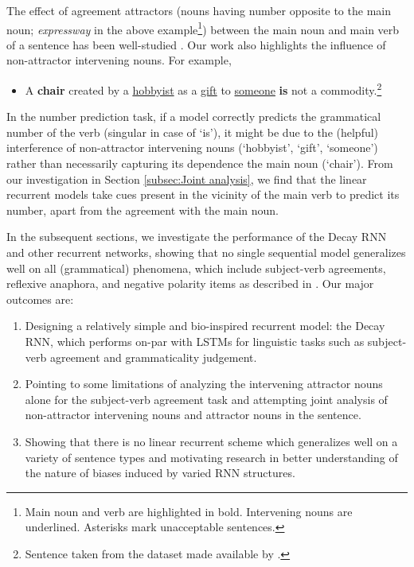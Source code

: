 \documentclass[11pt,a4paper]{article}
\begin{document}
The effect of agreement attractors (nouns having number opposite to the main noun; \textit{expressway} in the above example\footnote{Main noun and verb are highlighted in bold. Intervening nouns are underlined. Asterisks mark unacceptable sentences.}) between the main noun and main verb of a sentence has been well-studied \cite{linzen2016assessing,kuncoro-etal-2018-lstms}. Our work also highlights the influence of non-attractor intervening nouns. For example,
\begin{itemize}
    \item A \textbf{chair} created by a \underline{hobbyist} as a \underline{gift} to \underline{someone} \textbf{is} not a commodity.\footnote{\label{note2}Sentence taken from the dataset made available by \citet{linzen2016assessing}.}
\end{itemize}
In the number prediction task, if a model correctly predicts the grammatical number of the verb (singular in case of `is'), it might be due to the (helpful) interference of non-attractor intervening nouns (`hobbyist', `gift', `someone') rather than necessarily capturing its dependence the main noun (`chair'). From our investigation in Section \ref{subsec:Joint analysis}, we find that the linear recurrent models take cues present in the vicinity of the main verb to predict its number, apart from the agreement with the main noun.

In the subsequent sections, we investigate the performance of the Decay RNN and other recurrent networks, showing that no single sequential model generalizes well on all (grammatical) phenomena, which include subject-verb agreements, reflexive anaphora, and negative polarity items as described in \citet{marvin2018targeted}.
Our major outcomes are: 

\begin{enumerate}
    \item Designing a relatively simple and bio-inspired recurrent model: the Decay RNN, which performs on-par with LSTMs for linguistic tasks such as subject-verb agreement and grammaticality judgement.   
\item Pointing to some limitations of analyzing the intervening attractor nouns alone for the subject-verb agreement task and attempting joint analysis of non-attractor intervening nouns and attractor nouns in the sentence.
    \item Showing that there is no linear recurrent scheme which generalizes well on a variety of sentence types and motivating research in better understanding of the nature of biases induced by varied RNN structures.
\end{enumerate}
\end{document}
